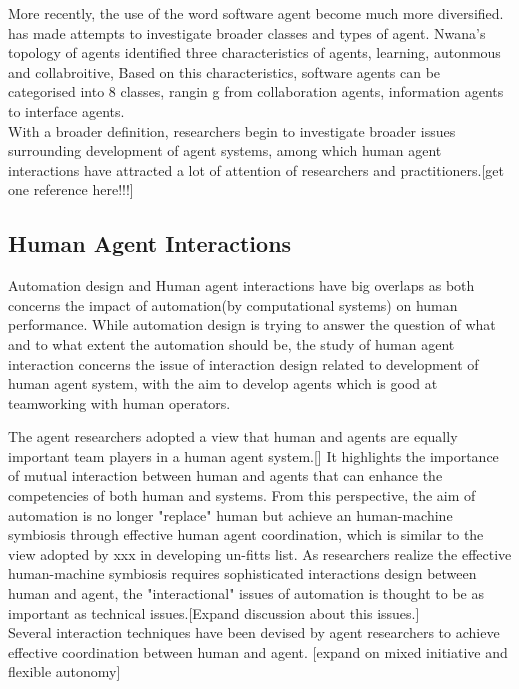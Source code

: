 More recently, the use of the word software agent become much more diversified. \cite{Nwana1996} has made attempts to investigate broader classes and types of agent. Nwana's \cite{Nwana1996} topology of agents identified three characteristics of agents, learning, autonmous and collabroitive, Based on this characteristics, software agents can be categorised into 8 classes, rangin g from collaboration agents, information agents to interface agents. \\

With a broader definition, researchers begin to investigate broader issues surrounding development of agent systems, among which human agent interactions have attracted a lot of attention of researchers and practitioners.[get one reference here!!!]

\subsection{ Human Agent Interactions }

Automation design and Human agent interactions have big overlaps as both concerns the impact of automation(by computational systems) on human performance. While automation design is trying to answer the question of what and to what extent the automation should be, the study of human agent interaction concerns the issue of interaction design related to development of human agent system, with the aim to develop agents which is good at teamworking with human operators. 

The agent researchers adopted a view that human and agents are equally important team players in a human agent system.[] It highlights the importance of mutual interaction between human and agents that can enhance the competencies of both human and systems. From this perspective, the aim of automation is no longer "replace" human but achieve an human-machine symbiosis through effective human agent coordination, which is similar to the view adopted by xxx in developing un-fitts list. As researchers realize the effective human-machine symbiosis requires sophisticated interactions design between human and agent, the "interactional" issues of automation is thought to be as important as technical issues.[Expand discussion about this issues.] \cite{Bradshaw2011} \\

Several interaction techniques have been devised by agent researchers to achieve effective coordination between human and agent. [expand on mixed initiative and flexible autonomy]

